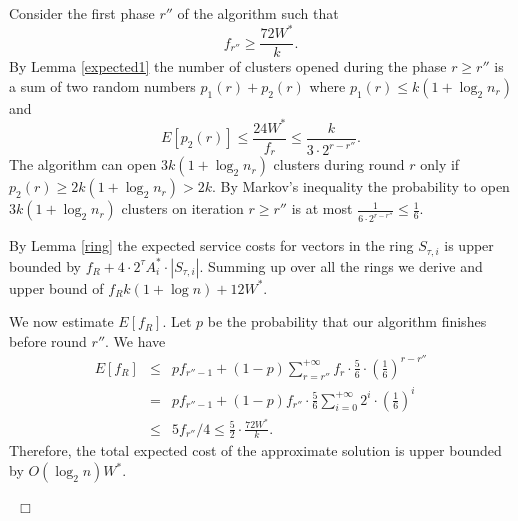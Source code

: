 \documentclass{article}
\newenvironment{proof}{\medskip\noindent {\bf Proof.}}{~\hfill$\Box$\medskip}
\begin{document}
\begin{proof}  Consider the first  phase $r''$ of the algorithm such that 
$$f_{r''}\ge \frac{72W^*}{k}.$$
By Lemma \ref{expected1} the  number of clusters opened  during the  phase $r\ge r''$ is a sum of two random numbers
$p_1(r)+p_2(r)$ where $p_1(r)\le k(1+\log_2n_{r})$ and 
$$E[p_2(r)]\le \frac{24W^*}{f_{r}} \le \frac{k}{3\cdot 2^{r-r''}}.$$
The algorithm can open   $3 k(1+\log_2n_r) $ clusters during round $r$ only if  $p_2(r)\ge 2 k(1+\log_2n_r)>2k$. By Markov's inequality the probability to open  $3 k(1+\log_2n_r) $ clusters on iteration $r\ge r''$ is at most $\frac{1}{6\cdot 2^{r-r''}}\le \frac{1}{6}$.  

By Lemma \ref{ring} the expected service costs for vectors in the ring $S_{\tau,i}$ is upper bounded by $f_R+ 4\cdot 2^{\tau}A_i^*\cdot |S_{\tau,i}|$. Summing up over all the rings we derive and upper bound of
$f_Rk(1+\log n)+ 12W^*$.

We now estimate $E[f_R]$. Let $p$ be the probability that our algorithm finishes before round $r''$. We have
\begin{eqnarray*}
E[f_R]&\le& p f_{r''-1} + (1-p)\sum_{r=r''}^{+\infty}f_r\cdot \frac56 \cdot \left(\frac16\right)^{r-r''}\\
&=&p f_{r''-1} + (1-p)f_{r''}\cdot \frac56\sum_{i=0}^{+\infty}2^i\cdot \left(\frac16\right)^i\\
&\le& 5f_{r''}/4  \le \frac52 \cdot \frac{72W^*}{k}.
\end{eqnarray*}
 Therefore, the total expected cost of the approximate solution is upper bounded by $O(\log_2 n)W^*$.

\end{proof}

\end{document}
